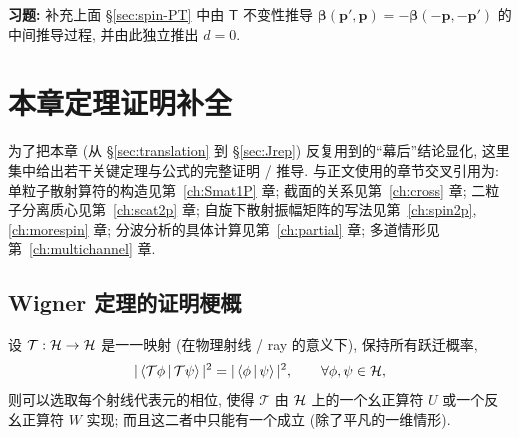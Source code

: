 \bigskip

\noindent\textbf{习题:} 补充上面 \S\ref{sec:spin-PT} 中由 $\mathsf{T}$ 不变性推导 $\bm{\beta}(\mathbf{p}',\mathbf{p})=-\bm{\beta}(-\mathbf{p},-\mathbf{p}')$ 的中间推导过程, 并由此独立推出 $d=0$.


\section{本章定理证明补全}\label{sec:inv-proofs}

为了把本章 (从 \S\ref{sec:translation} 到 \S\ref{sec:Jrep}) 反复用到的``幕后''结论显化, 这里集中给出若干关键定理与公式的完整证明 / 推导. 与正文使用的章节交叉引用为: 单粒子散射算符的构造见第~\ref{ch:Smat1P} 章; 截面的关系见第~\ref{ch:cross} 章; 二粒子分离质心见第~\ref{ch:scat2p} 章; 自旋下散射振幅矩阵的写法见第~\ref{ch:spin2p}, \ref{ch:morespin} 章; 分波分析的具体计算见第~\ref{ch:partial} 章; 多道情形见第~\ref{ch:multichannel} 章.


\subsection{Wigner 定理的证明梗概}\label{sec:inv-wigner}

\begin{theorem}[Wigner, 1931]\label{thm:inv-wigner}
设 $\mathcal{T}: \mathcal{H}\to \mathcal{H}$ 是一一映射 (在物理射线 / ray 的意义下), 保持所有跃迁概率,
\begin{equation}\label{eq:inv-wigner-prob}
|\left\langle \mathcal{T}\phi \,\middle|\, \mathcal{T}\psi \right\rangle|^2 = |\left\langle \phi \,\middle|\, \psi \right\rangle|^2,\qquad \forall \phi,\psi\in \mathcal{H},
\end{equation}
则可以选取每个射线代表元的相位, 使得 $\mathcal{T}$ 由 $\mathcal{H}$ 上的一个幺正算符 $U$ 或一个反幺正算符 $W$ 实现; 而且这二者中只能有一个成立 (除了平凡的一维情形).
\end{theorem}

